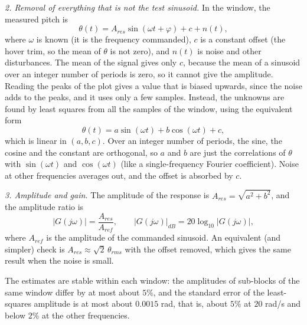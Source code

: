 \emph{2. Removal of everything that is not the test sinusoid.}
In the window, the measured pitch is
\begin{equation*}
\theta(t) = A_{res}\sin(\omega t + \varphi) + c + n(t) ,
\end{equation*}
where $\omega$ is known (it is the frequency commanded), $c$ is a constant offset (the hover trim, so the mean of $\theta$ is not zero), and $n(t)$ is noise and other disturbances.
The mean of the signal gives only $c$, because the mean of a sinusoid over an integer number of periods is zero, so it cannot give the amplitude.
Reading the peaks of the plot gives a value that is biased upwards, since the noise adds to the peaks, and it uses only a few samples.
Instead, the unknowns are found by least squares from all the samples of the window, using the equivalent form
\begin{equation*}
\theta(t) = a\sin(\omega t) + b\cos(\omega t) + c ,
\end{equation*}
which is linear in $(a, b, c)$.
Over an integer number of periods, the sine, the cosine and the constant are orthogonal, so $a$ and $b$ are just the correlations of $\theta$ with $\sin(\omega t)$ and $\cos(\omega t)$ (like a single-frequency Fourier coefficient).
Noise at other frequencies averages out, and the offset is absorbed by $c$.

\emph{3. Amplitude and gain.}
The amplitude of the response is $A_{res} = \sqrt{a^2 + b^2}$, and the amplitude ratio is
\begin{equation*}
|G(j\omega)| = \frac{A_{res}}{A_{ref}}, \qquad |G(j\omega)|_{dB} = 20\log_{10}|G(j\omega)| ,
\end{equation*}
where $A_{ref}$ is the amplitude of the commanded sinusoid.
An equivalent (and simpler) check is $A_{res} \approx \sqrt{2}\,\theta_{rms}$ with the offset removed, which gives the same result when the noise is small.

The estimates are stable within each window: the amplitudes of sub-blocks of the same window differ by at most about $5\%$, and the standard error of the least-squares amplitude is at most about $0.0015$ rad, that is, about $5\%$ at $20$ rad/s and below $2\%$ at the other frequencies.

